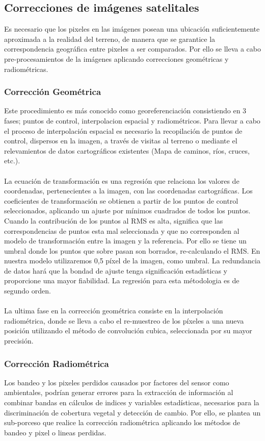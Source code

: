 \subsection{Correcciones de im\'agenes satelitales}
Es necesario que los pixeles en las im\'agenes posean una ubicaci\'on suficientemente aproximada a la realidad del terreno, de manera que se garantice la correspondencia geogr\'afica entre pixeles a ser comparados. Por ello se lleva a cabo pre-procesamientos de la im\'agenes aplicando correcciones geom\'etricas y radiom\'etricas.
\subsubsection{Correcci\'on Geom\'etrica}
Este procedimiento es m\'as conocido como georeferenciaci\'on consistiendo en 3 fases; puntos de control, interpolacion espacial y radiom\'etricos. Para llevar a cabo el proceso de interpolaci\'on espacial es necesario la recopilaci\'on de puntos de control, dispersos en la imagen, a trav\'es de visitas al terreno o mediante el relevamientos de datos cartogr\'aficos existentes (Mapa de caminos, ríos, cruces, etc.).\\~\\
La ecuaci\'on de transformaci\'on es una regresi\'on que relaciona los valores de coordenadas, pertenecientes a la imagen, con las coordenadas cartogr\'aficas. Los coeficientes de transformaci\'on se obtienen a partir de los puntos de control seleccionados, aplicando un ajuste por m\'inimos cuadrados de todos los puntos. Cuando la contribuci\'on de los puntos al RMS es alta, significa que las correspondencias de puntos esta mal seleccionada y que no corresponden al modelo de transformaci\'on entre la imagen y la referencia. Por ello se tiene un umbral donde los puntos que sobre pasan son borrados, re-calculando el RMS. En nuestra modelo utilizaremos 0,5 p\'ixel de la imagen, como umbral. La redundancia de datos har\'a que la bondad de ajuste tenga significaci\'on estad\'isticas y proporcione una mayor fiabilidad. La regresi\'on para esta m\'etodologia es de segundo orden.\\~\\
La ultima fase en la correcci\'on geom\'etrica consiste en la interpolaci\'on radiom\'etrica, donde se lleva a cabo el re-muestreo de los p\'ixeles a una nueva posici\'on utilizando el m\'etodo de convoluci\'on cubica, seleccionada por su mayor precisi\'on.
\subsubsection{Correcci\'on Radiom\'etrica}
Los bandeo y los pixeles perdidos causados por factores del sensor como ambientales, podr\'ian generar errores para la extracci\'on de informaci\'on al combinar bandas en c\'alculos de indices y variables estad\'isticas, necesarios para la discriminaci\'on de cobertura vegetal y detecci\'on de cambio. Por ello, se plantea un sub-porceso que realice la correcci\'on radiom\'etrica aplicando los m\'etodos de bandeo y pixel o lineas perdidas.


